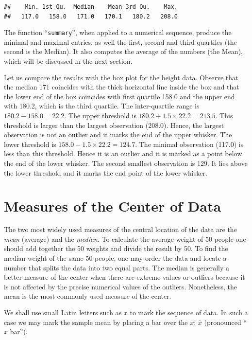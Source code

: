 \documentclass[
]{krantz}
\theoremstyle{definition}
\theoremstyle{definition}
\theoremstyle{definition}
\theoremstyle{remark}
\begin{document}
\begin{verbatim}
##    Min. 1st Qu.  Median    Mean 3rd Qu.    Max. 
##   117.0   158.0   171.0   170.1   180.2   208.0
\end{verbatim}

The function ``\texttt{summary}'', when applied to a numerical sequence, produce
the minimal and maximal entries, as well the first, second and third
quartiles (the second is the Median). It also computes the average of
the numbers (the Mean), which will be discussed in the next section.

Let us compare the results with the box plot for the height data.
Observe that the median 171 coincides
with the thick horizontal line inside the box and that the lower end of
the box coincides with first quartile 158.0 and the upper end with
180.2, which is the third quartile. The inter-quartile range is
\(180.2 - 158.0 = 22.2\). The upper threshold is
\(180.2 + 1.5 \times 22.2 = 213.5\). This threshold is larger than the
largest observation (208.0). Hence, the largest observation is not an
outlier and it marks the end of the upper whisker. The lower threshold
is \(158.0 - 1.5 \times 22.2 = 124.7\). The minimal observation (117.0) is
less than this threshold. Hence it is an outlier and it is marked as a
point below the end of the lower whisker. The second smallest
observation is 129. It lies above the lower threshold and it marks the
end point of the lower whisker.

\hypertarget{measures-of-the-center-of-data}{%
\section{Measures of the Center of Data}\label{measures-of-the-center-of-data}}

The two most widely used measures of the central location of the data
are the \emph{mean} (average) and the \emph{median}. To calculate the average
weight of 50 people one should add together the 50 weights and divide
the result by 50. To find the median weight of the same 50 people, one
may order the data and locate a number that splits the data into two
equal parts. The median is generally a better measure of the center when
there are extreme values or outliers because it is not affected by the
precise numerical values of the outliers. Nonetheless, the mean is the
most commonly used measure of the center.

We shall use small Latin letters such as \(x\) to mark the sequence of
data. In such a case we may mark the sample mean by placing a bar over
the \(x\): \(\bar x\) (pronounced ``\(x\) bar'').
\end{document}
